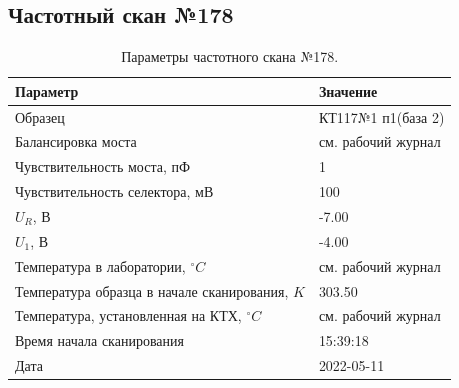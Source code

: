 \subsection{Частотный скан №178}
\begin{table}[!ht]
    \centering
    \caption{Параметры частотного скана №178.}
    \begin{tabular}{|l|l|}
        \hline
        Параметр                                       & Значение                  \\ \hline
        Образец                                        & КТ117№1 п1(база 2)        \\ \hline
        Балансировка моста                             & см. рабочий журнал        \\ \hline
        Чувствительность моста, пФ                     & 1                         \\ \hline
        Чувствительность селектора, мВ                 & 100                       \\ \hline
        $U_R$, В                                       & -7.00                     \\ \hline
        $U_1$, В                                       & -4.00                     \\ \hline
        Температура в лаборатории, $^\circ C$          & см. рабочий журнал        \\ \hline
        Температура образца в начале сканирования, $K$ & 303.50                    \\ \hline
        Температура, установленная на КТХ, $^\circ C$  & см. рабочий журнал        \\ \hline
        Время начала сканирования                      & 15:39:18                  \\ \hline
        Дата                                           & 2022-05-11                \\ \hline
    \end{tabular}
    \label{table:frequency_scan_178}
\end{table}

